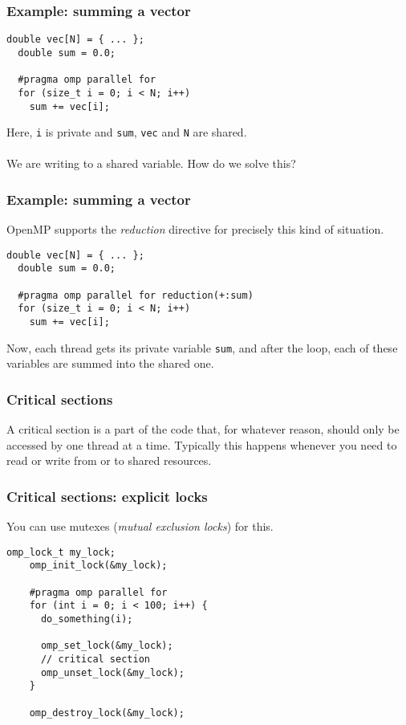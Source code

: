 \begin{frame}[fragile]
  \frametitle{Example: summing a vector}
\begin{lstlisting}[style=c]
  double vec[N] = { ... };
  double sum = 0.0;

  #pragma omp parallel for
  for (size_t i = 0; i < N; i++)
    sum += vec[i];
\end{lstlisting}
  Here, \texttt{i} is private and \texttt{sum}, \texttt{vec} and \texttt{N} are
  shared. \\~\\

  We are writing to a shared variable. How do we solve this?
\end{frame}

\begin{frame}[fragile]
  \frametitle{Example: summing a vector}
  OpenMP supports the \emph{reduction} directive for precisely this kind of
  situation.
\begin{lstlisting}[style=c]
  double vec[N] = { ... };
  double sum = 0.0;

  #pragma omp parallel for reduction(+:sum)
  for (size_t i = 0; i < N; i++)
    sum += vec[i];
\end{lstlisting}
  Now, each thread gets its private variable \texttt{sum}, and after the loop,
  each of these variables are summed into the shared one.
\end{frame}

\begin{frame}[fragile]
  \frametitle{Critical sections}
  \begin{center}
    \scalebox{0.8}{}
  \end{center}
  A critical section is a part of the code that, for whatever reason, should
  only be accessed by one thread at a time. Typically this happens whenever you
  need to read or write from or to shared resources.
\end{frame}

\begin{frame}[fragile]
  \frametitle{Critical sections: explicit locks}
  You can use mutexes (\emph{mutual exclusion locks}) for this.
  \begin{lstlisting}[style=c]
    omp_lock_t my_lock;
    omp_init_lock(&my_lock);

    #pragma omp parallel for
    for (int i = 0; i < 100; i++) {
      do_something(i);

      omp_set_lock(&my_lock);
      // critical section
      omp_unset_lock(&my_lock);
    }

    omp_destroy_lock(&my_lock);
  \end{lstlisting}
\end{frame}

